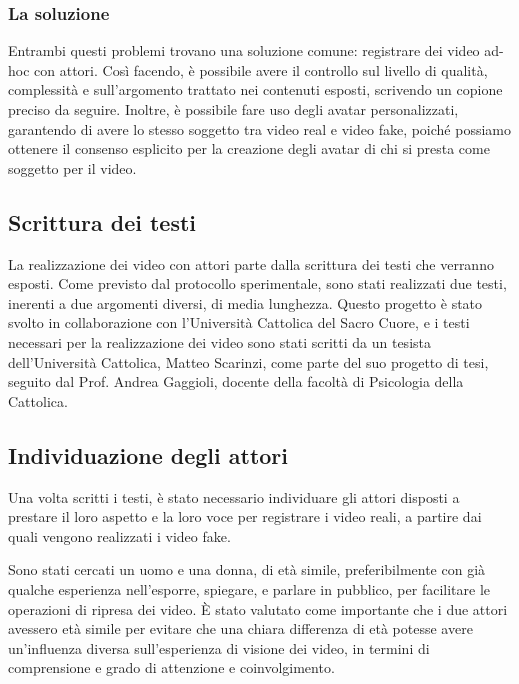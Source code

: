 \subsubsection{La soluzione}

Entrambi questi problemi trovano una soluzione comune: registrare dei video ad-hoc con attori. Così facendo, è possibile avere il controllo sul livello di qualità, complessità e sull'argomento trattato nei contenuti esposti, scrivendo un copione preciso da seguire. Inoltre, è possibile fare uso degli avatar personalizzati, garantendo di avere lo stesso soggetto tra video real e video fake, poiché possiamo ottenere il consenso esplicito per la creazione degli avatar di chi si presta come soggetto per il video.

\subsection{Scrittura dei testi}

La realizzazione dei video con attori parte dalla scrittura dei testi che verranno esposti. Come previsto dal protocollo sperimentale, sono stati realizzati due testi, inerenti a due argomenti diversi, di media lunghezza. Questo progetto è stato svolto in collaborazione con l'Università Cattolica del Sacro Cuore, e i testi necessari per la realizzazione dei video sono stati scritti da un tesista dell'Università Cattolica, Matteo Scarinzi, come parte del suo progetto di tesi, seguito dal Prof. Andrea Gaggioli, docente della facoltà di Psicologia della Cattolica.

\subsection{Individuazione degli attori}

Una volta scritti i testi, è stato necessario individuare gli attori disposti a prestare il loro aspetto e la loro voce per registrare i video reali, a partire dai quali vengono realizzati i video fake.

Sono stati cercati un uomo e una donna, di età simile, preferibilmente con già qualche esperienza nell'esporre, spiegare, e parlare in pubblico, per facilitare le operazioni di ripresa dei video. È stato valutato come importante che i due attori avessero età simile per evitare che una chiara differenza di età potesse avere un'influenza diversa sull'esperienza di visione dei video, in termini di comprensione e grado di attenzione e coinvolgimento.

